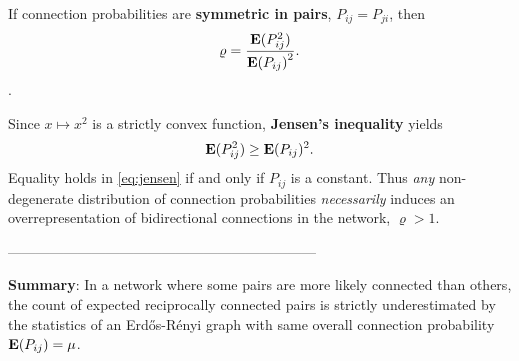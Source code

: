 If connection probabilities are \textbf{symmetric in pairs}, $P_{ij} = P_{ji}$, then
\begin{align}
\varrho = \frac{\E(P_{ij}^2)}{{\E\left(P_{ij}\right)}^2}.
\end{align}.

Since $x \mapsto x^2$ is a strictly convex function, \textbf{Jensen's inequality} \cite{Jensen1906} yields
\begin{align}
\operatorname{\mathbf{E}}(P_{ij}^2) \geq \operatorname{\mathbf{E}}(P_{ij})^2. \label{eq:jensen}
\end{align}
Equality holds in \eqref{eq:jensen} if and only if $P_{ij}$ is a constant. Thus \textit{any} non-degenerate distribution of connection probabilities \textit{necessarily} induces an overrepresentation of bidirectional connections in the network, $\varrho > 1$.

\begin{center}
  ------------------------------------------------------------------
\end{center}

\textcolor{gblue}{\textbf{Summary}}: In a network where some pairs are more likely connected than others, the count of expected reciprocally connected pairs is strictly underestimated by the statistics of an Erd\H{o}s-R\'{e}nyi graph with same overall connection probability $\operatorname{\mathbf{E}}(P_{ij}) = \mu$.

